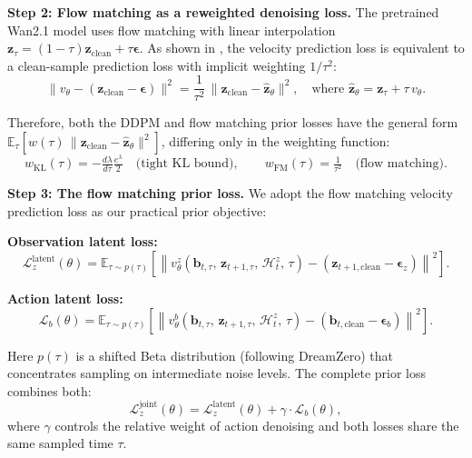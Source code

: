 \documentclass{article}
\newcommand{\vz}{\bm{z}}
\newcommand{\vb}{\bm{b}}
\newcommand{\vep}{\bm{\epsilon}}
\newcommand{\E}{\mathbb{E}}
\newcommand{\KL}{\mathrm{KL}}
\newcommand{\loss}{\mathcal{L}}
\begin{document}
\textbf{Step 2: Flow matching as a reweighted denoising loss.}
The pretrained Wan2.1 model uses flow matching with linear interpolation $\vz_\tau = (1-\tau)\vz_{\text{clean}} + \tau\vep$. As shown in , the velocity prediction loss is equivalent to a clean-sample prediction loss with implicit weighting $1/\tau^2$:
\begin{equation}
  \|v_\theta - (\vz_{\text{clean}} - \vep)\|^2 = \frac{1}{\tau^2}\,\|\vz_{\text{clean}} - \hat{\vz}_\theta\|^2,
  \quad\text{where } \hat{\vz}_\theta = \vz_\tau + \tau\, v_\theta.
  \label{eq:fm_reweight}
\end{equation}

Therefore, both the DDPM and flow matching prior losses have the general form $\E_\tau[w(\tau)\,\|\vz_{\text{clean}} - \hat{\vz}_\theta\|^2]$, differing only in the weighting function:
\begin{equation}
  w_{\KL}(\tau) = -\tfrac{d\lambda}{d\tau}\tfrac{e^\lambda}{2} \quad\text{(tight KL bound)}, \qquad
  w_{\text{FM}}(\tau) = \tfrac{1}{\tau^2} \quad\text{(flow matching)}.
  \label{eq:weight_comparison}
\end{equation}

\textbf{Step 3: The flow matching prior loss.}
We adopt the flow matching velocity prediction loss as our practical prior objective:

\textbf{Observation latent loss:}
\begin{equation}
  \loss_z^{\text{latent}}(\theta) = \E_{\tau \sim p(\tau)}\!\left[
    \left\|v_\theta^z\!\left(\vb_{t,\tau},\, \vz_{t+1,\tau},\, \mathcal{H}_t^z,\, \tau\right) - (\vz_{t+1,\text{clean}} - \vep_z)\right\|^2
  \right].
  \label{eq:ac_prior_loss}
\end{equation}

\textbf{Action latent loss:}
\begin{equation}
  \loss_b(\theta) = \E_{\tau \sim p(\tau)}\!\left[
    \left\|v_\theta^b\!\left(\vb_{t,\tau},\, \vz_{t+1,\tau},\, \mathcal{H}_t^z,\, \tau\right) - (\vb_{t,\text{clean}} - \vep_b)\right\|^2
  \right].
  \label{eq:action_latent_loss}
\end{equation}

Here $p(\tau)$ is a shifted Beta distribution (following DreamZero) that concentrates sampling on intermediate noise levels. The complete prior loss combines both:
\begin{equation}
  \loss_z^{\text{joint}}(\theta) = \loss_z^{\text{latent}}(\theta) + \gamma \cdot \loss_b(\theta),
  \label{eq:joint_prior_loss}
\end{equation}
where $\gamma$ controls the relative weight of action denoising and both losses share the same sampled time $\tau$.
\end{document}
